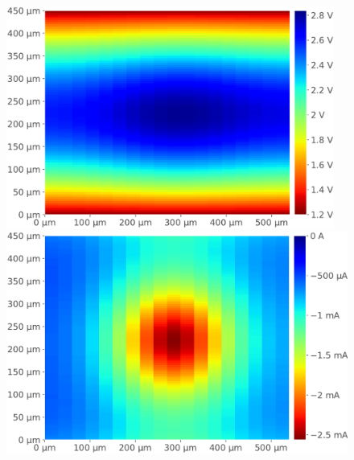 
\begin{figure}[hbtp]
%

	\begin{minipage}{0.3\textwidth}
		\centering
		\includegraphics[width=0.96\textwidth]{./figures/modelesSimusResul/dualWell/negative/vddMgndManuscrit-cropped.pdf}
		\includegraphics[width=\textwidth]{./figures/modelesSimusResul/dualWell/negative/iEpiDualWellManuscrit-cropped.pdf}

\end{minipage}
\end{figure}

